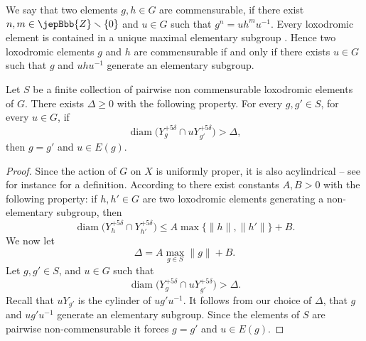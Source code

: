 We say that two elements $g,h\in G$ are commensurable, if there exist $n,m\in\jepBbb{Z}\smallsetminus\{0\}$ and $u\in G$ such that $g^n=uh^mu^{-1}$. Every loxodromic element is contained in a unique maximal elementary subgroup \cite[Lem.\,3.28]{ref07}. Hence two loxodromic elements $g$ and $h$ are commensurable if and only if there exists $u\in G$ such that $g$ and $uhu^{-1}$ generate an elementary subgroup.

\begin{lemma}\label{lem:overlap}
Let $S$ be a finite collection of pairwise non commensurable loxodromic elements of $G$. There exists $\Delta\geqslant0$ with the following property. For every $g,g'\in S$, for every $u\in G$, if
\[
\operatorname{diam}\bigl(Y_g^{+5\delta}\cap uY_{g'}^{+5\delta}\bigr)>\Delta,
\]
then $g=g'$ and $u\in E(g)$.
\end{lemma}
\begin{proof}
Since the action of $G$ on $X$ is uniformly proper, it is also acylindrical -- see for instance \cite[p.\,284]{ref02} for a definition. According to \cite[Prop.\,3.44 and Lem.\,6.14]{ref07} there exist constants $A,B>0$ with the following property: if $h,h'\in G$ are two loxodromic elements generating a non-elementary subgroup, then
\[
\operatorname{diam}\bigl(Y_h^{+5\delta}\cap Y_{h'}^{+5\delta}\bigr)\leqslant A\max\{\|h\|,\|h'\|\}+B.
\]
We now let
\[
\Delta=A\max_{g\in S}\|g\|+B.
\]
Let $g,g'\in S$, and $u\in G$ such that
\[
\operatorname{diam}\bigl(Y_g^{+5\delta}\cap uY_{g'}^{+5\delta}\bigr)>\Delta.
\]
Recall that $uY_{g'}$ is the cylinder of $ug'u^{-1}$. It follows from our choice of $\Delta$, that $g$ and $ug'u^{-1}$ generate an elementary subgroup. Since the elements of $S$ are pairwise non-commensurable it forces $g=g'$ and $u\in E(g)$.
\end{proof}

